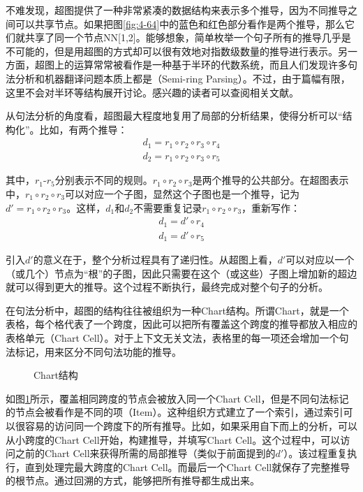 \parinterval 不难发现，超图提供了一种非常紧凑的数据结构来表示多个推导，因为不同推导之间可以共享节点。如果把图\ref{fig:4-64}中的蓝色和红色部分看作是两个推导，那么它们就共享了同一个节点NN[1,2]。能够想象，简单枚举一个句子所有的推导几乎是不可能的，但是用超图的方式却可以很有效地对指数级数量的推导进行表示。另一方面，超图上的运算常常被看作是一种基于半环的代数系统，而且人们发现许多句法分析和机器翻译问题本质上都是{\small{}}（Semi-ring Parsing）。不过，由于篇幅有限，这里不会对半环等结构展开讨论。感兴趣的读者可以查阅相关文献\cite{goodman1999semiring,eisner2002parameter}。

\parinterval 从句法分析的角度看，超图最大程度地复用了局部的分析结果，使得分析可以``结构化''。比如，有两个推导：
\begin{eqnarray}
d_1 = {r_1} \circ {r_2} \circ {r_3} \circ {r_4} \label{eqa4.30}\\
d_2 = {r_1} \circ {r_2} \circ {r_3} \circ {r_5}
\label{eq:4-31}
\end{eqnarray}

\noindent 其中，$r_1$-$r_5$分别表示不同的规则。${r_1} \circ {r_2} \circ {r_3}$是两个推导的公共部分。在超图表示中，${r_1} \circ {r_2} \circ {r_3}$可以对应一个子图，显然这个子图也是一个推导，记为${d'}= {r_1} \circ {r_2} \circ {r_3}$。这样，$d_1$和$d_2$不需要重复记录${r_1} \circ {r_2} \circ {r_3}$，重新写作：
\begin{eqnarray}
d_1 = {d'} \circ {r_4} \label{eqa4.32}\\
d_1 = {d'} \circ {r_5}
\label{eq:4-33}
\end{eqnarray}

\parinterval 引入$d'$的意义在于，整个分析过程具有了递归性。从超图上看，$d'$可以对应以一个（或几个）节点为``根''的子图，因此只需要在这个（或这些）子图上增加新的超边就可以得到更大的推导。这个过程不断执行，最终完成对整个句子的分析。

\parinterval 在句法分析中，超图的结构往往被组织为一种Chart结构。所谓Chart，就是一个表格，每个格代表了一个跨度，因此可以把所有覆盖这个跨度的推导都放入相应的表格单元（Chart Cell）。对于上下文无关文法，表格里的每一项还会增加一个句法标记，用来区分不同句法功能的推导。

\begin{figure}[htp]
\centering

\caption{Chart结构}
\label{fig:4-65}
\end{figure}

\parinterval 如图\ref{fig:4-65}所示，覆盖相同跨度的节点会被放入同一个Chart Cell，但是不同句法标记的节点会被看作是不同的项（Item）。这种组织方式建立了一个索引，通过索引可以很容易的访问同一个跨度下的所有推导。比如，如果采用自下而上的分析，可以从小跨度的Chart Cell开始，构建推导，并填写Chart Cell。这个过程中，可以访问之前的Chart Cell来获得所需的局部推导（类似于前面提到的$d'$）。该过程重复执行，直到处理完最大跨度的Chart Cell。而最后一个Chart Cell就保存了完整推导的根节点。通过回溯的方式，能够把所有推导都生成出来。

